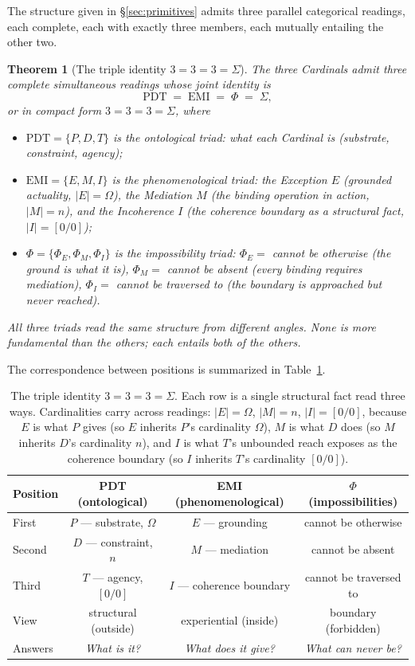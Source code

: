 \documentclass[11pt,a4paper]{article}
\newtheorem{theorem}{Theorem}[section]
\theoremstyle{definition}
\theoremstyle{remark}
\begin{document}
The structure given in \S\ref{sec:primitives} admits three parallel categorical readings, each complete, each with exactly three members, each mutually entailing the other two.

\begin{theorem}[The triple identity $3=3=3=\Sigma$]\label{thm:triads}
The three Cardinals admit three complete simultaneous readings whose joint identity is
\[
\boxed{\;\mathrm{PDT} \;=\; \mathrm{EMI} \;=\; \Phi \;=\; \Sigma,\;}
\]
or in compact form $3=3=3=\Sigma$, where
\begin{itemize}[leftmargin=*]
\item $\mathrm{PDT} = \{P,D,T\}$ is the \emph{ontological} triad: what each Cardinal is (substrate, constraint, agency);
\item $\mathrm{EMI} = \{E,M,I\}$ is the \emph{phenomenological} triad: the Exception $E$ (grounded actuality, $|E|=\Omega$), the Mediation $M$ (the binding operation in action, $|M|=n$), and the Incoherence $I$ (the coherence boundary as a structural fact, $|I|=[0/0]$);
\item $\Phi = \{\Phi_{E},\Phi_{M},\Phi_{I}\}$ is the \emph{impossibility} triad: $\Phi_{E} = $ \textit{cannot be otherwise} (the ground is what it is), $\Phi_{M} = $ \textit{cannot be absent} (every binding requires mediation), $\Phi_{I} = $ \textit{cannot be traversed to} (the boundary is approached but never reached).
\end{itemize}
All three triads read the same structure from different angles. None is more fundamental than the others; each entails both of the others.
\end{theorem}

The correspondence between positions is summarized in Table~\ref{tab:triads}.

\begin{table}[h]
\centering
\begin{tabular}{@{}l c c c@{}}
\toprule
Position & PDT (ontological) & EMI (phenomenological) & $\Phi$ (impossibilities)\\
\midrule
First & $P$ --- substrate, $\Omega$ & $E$ --- grounding & cannot be otherwise\\
Second & $D$ --- constraint, $n$ & $M$ --- mediation & cannot be absent\\
Third & $T$ --- agency, $[0/0]$ & $I$ --- coherence boundary & cannot be traversed to\\
\addlinespace
View & structural (outside) & experiential (inside) & boundary (forbidden)\\
Answers & \textit{What is it?} & \textit{What does it give?} & \textit{What can never be?}\\
\bottomrule
\end{tabular}
\caption{The triple identity $3=3=3=\Sigma$. Each row is a single structural fact read three ways. Cardinalities carry across readings: $|E|=\Omega$, $|M|=n$, $|I|=[0/0]$, because $E$ is what $P$ gives (so $E$ inherits $P$'s cardinality $\Omega$), $M$ is what $D$ does (so $M$ inherits $D$'s cardinality $n$), and $I$ is what $T$'s unbounded reach exposes as the coherence boundary (so $I$ inherits $T$'s cardinality $[0/0]$).}
\label{tab:triads}
\end{table}
\end{document}
